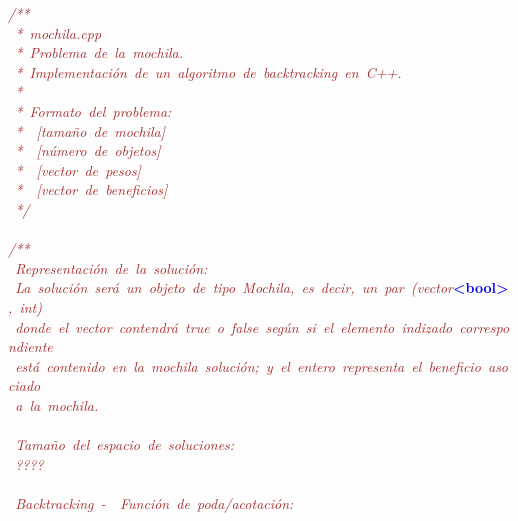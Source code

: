 \noindent
\mbox{}\textit{\textcolor{Brown}{/**}} \\
\mbox{}\textit{\textcolor{Brown}{\ *\ mochila.cpp}} \\
\mbox{}\textit{\textcolor{Brown}{\ *\ Problema\ de\ la\ mochila.}} \\
\mbox{}\textit{\textcolor{Brown}{\ *\ Implementación\ de\ un\ algoritmo\ de\ backtracking\ en\ C++.}} \\
\mbox{}\textit{\textcolor{Brown}{\ *}} \\
\mbox{}\textit{\textcolor{Brown}{\ *\ Formato\ del\ problema:\ }} \\
\mbox{}\textit{\textcolor{Brown}{\ *\ \ [tamaño\ de\ mochila]}} \\
\mbox{}\textit{\textcolor{Brown}{\ *\ \ [número\ de\ objetos]}} \\
\mbox{}\textit{\textcolor{Brown}{\ *\ \ [vector\ de\ pesos]}} \\
\mbox{}\textit{\textcolor{Brown}{\ *\ \ [vector\ de\ beneficios]}} \\
\mbox{}\textit{\textcolor{Brown}{\ */}} \\
\mbox{} \\
\mbox{}\textit{\textcolor{Brown}{/**}} \\
\mbox{}\textit{\textcolor{Brown}{\ Representación\ de\ la\ solución:}} \\
\mbox{}\textit{\textcolor{Brown}{\ La\ solución\ será\ un\ objeto\ de\ tipo\ Mochila,\ es\ decir,\ un\ par\ (vector}}\textbf{\textcolor{Blue}{\textless{}bool\textgreater{}}}\textit{\textcolor{Brown}{,\ int)}} \\
\mbox{}\textit{\textcolor{Brown}{\ donde\ el\ vector\ contendrá\ true\ o\ false\ según\ si\ el\ elemento\ indizado\ correspondiente}} \\
\mbox{}\textit{\textcolor{Brown}{\ está\ contenido\ en\ la\ mochila\ solución;\ y\ el\ entero\ representa\ el\ beneficio\ asociado}} \\
\mbox{}\textit{\textcolor{Brown}{\ a\ la\ mochila.}} \\
\mbox{} \\
\mbox{}\textit{\textcolor{Brown}{\ Tamaño\ del\ espacio\ de\ soluciones:}} \\
\mbox{}\textit{\textcolor{Brown}{\ ????}} \\
\mbox{} \\
\mbox{}\textit{\textcolor{Brown}{\ Backtracking\ -\ \ Función\ de\ poda/acotación:}} \\
